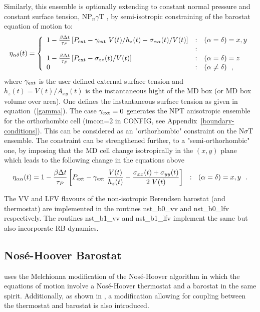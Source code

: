 Similarly, this ensemble is optionally extending to constant
normal pressure and constant surface tension, NP$_{n}\gamma$T
\cite{ikeguchi-04a}, by semi-isotropic constraining of the
barostat equation of motion to:
\begin{equation}
\eta_{\alpha\delta}(t) = \left\{ \begin{array} {l@{\quad:\quad}l}
1 - {\beta \Delta t \over \tau_{P}} \left[ P_{\rm ext} - \gamma_{\rm ext}~V(t) / h_{z}(t) -
\sigma_{\alpha\alpha}(t) / V(t) \right] & (\alpha = \delta) = x,y \\
& \\
1 - {\beta \Delta t \over \tau_{P}} \left[ P_{\rm ext} -
\sigma_{zz}(t) / V(t) \right] & (\alpha = \delta) = z \\
0 & (\alpha \ne \delta)~~,
\end{array} \right.
\end{equation}
where $\gamma_{\rm ext}$ is the user defined external surface tension
and $h_{z}(t) = V(t) / A_{xy}(t)$ is the instantaneous hight of the
MD box (or MD box volume over area).  One defines the instantaneous surface
tension as given in equation~(\ref{gamma}).  The case $\gamma_{\rm ext}=0$
generates the NPT anisotropic ensemble for the orthorhombic cell
(imcon=2 in CONFIG, see Appendix~\ref{boundary-conditions}).  This
can be considered as an "orthorhombic" constraint on the N$\sigma$T ensemble.
The constraint can be strengthened further, to a "semi-orthorhombic" one, by
imposing that the MD cell change isotropically in the $(x,y)$ plane
which leads to the following change in the equations above
\begin{equation}
\eta_{\alpha\alpha}(t) = 1 - {\beta \Delta t \over \tau_{P}}
\left[ P_{\rm ext} - \gamma_{\rm ext}~ \frac{V(t)}{h_{z}(t)} -
\frac{\sigma_{xx}(t)+\sigma_{yy}(t)}{2~V(t)} \right]~~:~~(\alpha = \delta) = x,y~~.
\end{equation}

The VV and LFV flavours of the non-isotropic Berendsen barostat (and thermostat)
are implemented in the \D routines {\sc nst\_b0\_vv} and {\sc nst\_b0\_lfv} respectively.
The routines {\sc nst\_b1\_vv} and {\sc nst\_b1\_lfv} implement the
same but also incorporate RB dynamics.

\subsection{Nos\'{e}-Hoover Barostat}

\D uses the Melchionna modification of the Nos\'e-Hoover algorithm
\cite{melchionna-93a} in which the equations of motion involve a
Nos\'e-Hoover thermostat and a
barostat in the same spirit.
Additionally, as shown in \cite{martyna-94a}, a modification
allowing for coupling between the thermostat and barostat is also
introduced.

